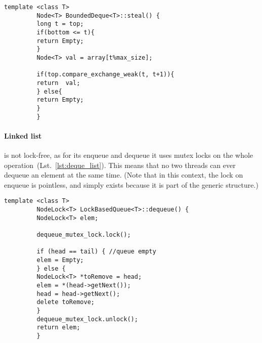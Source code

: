 \documentclass [10pt]{scrartcl}
\begin{document}
   
   \begin{center}
      \begin{minipage}[c]{.9\textwidth}
         \begin{lstlisting}[caption={\texttt{steal} uses atomic swap to handle concurrent steals}, label={lst:steal_bounded}]
         template <class T>
         Node<T> BoundedDeque<T>::steal() {
         long t = top;
         if(bottom <= t){
         return Empty;
         }
         Node<T> val = array[t%max_size];
         
         if(top.compare_exchange_weak(t, t+1)){
         return  val;
         } else{
         return Empty;
         }
         }
         \end{lstlisting}
      \end{minipage}
   \end{center}
   
   
   \paragraph{Linked list} is not lock-free, as for its enqueue and dequeue it uses mutex locks on the whole operation~(Lst.~\ref{lst:deque_list}). This means that no two threads can ever dequeue an element at the same time. (Note that in this context, the lock on enqueue is pointless, and simply exists because it is part of the generic structure.)
   
   \begin{center}
      \begin{minipage}{.9\textwidth}    
         \begin{lstlisting}[caption={\texttt{deque} requires a lock before being run}, label={lst:deque_list}]
         template <class T>
         NodeLock<T> LockBasedQueue<T>::dequeue() {
         NodeLock<T> elem;
         
         dequeue_mutex_lock.lock();
         
         if (head == tail) { //queue empty
         elem = Empty;
         } else {
         NodeLock<T> *toRemove = head;
         elem = *(head->getNext());
         head = head->getNext();
         delete toRemove;
         }
         dequeue_mutex_lock.unlock();
         return elem;
         }
         \end{lstlisting}
      \end{minipage}
   \end{center}
   
   
   
   
\end{document}
